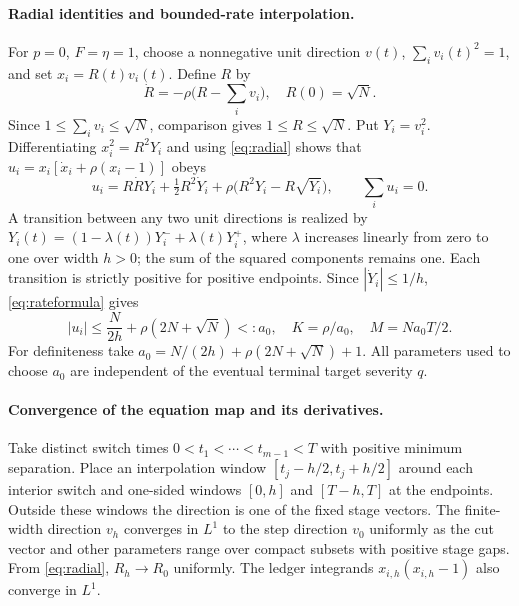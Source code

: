\documentclass[review,hidelinks,onefignum,onetabnum]{siamonline250211}%
\begin{document}
\paragraph{Radial identities and bounded-rate interpolation.}
For $p=0$, $F=\eta=1$, choose a nonnegative unit direction
$v(t)$, $\sum_i v_i(t)^2=1$, and set $x_i=R(t)v_i(t)$.
Define $R$ by
\begin{equation}\label{eq:radial}
 \dot R=-\rho\bigl(R-\sum_i v_i\bigr),\quad R(0)=\sqrt N.
\end{equation}
Since $1\le\sum_i v_i\le\sqrt N$, comparison gives
$1\le R\le\sqrt N$. Put $Y_i=v_i^2$.
Differentiating $x_i^2=R^2Y_i$ and using \eqref{eq:radial}
shows that $u_i=x_i[\dot x_i+\rho(x_i-1)]$ obeys
\begin{equation}\label{eq:rateformula}
 u_i=R\dot RY_i+\tfrac12R^2\dot Y_i
      +\rho\bigl(R^2Y_i-R\sqrt{Y_i}\bigr),\qquad \sum_i u_i=0.
\end{equation}
A transition between any two unit directions is realized by
$Y_i(t)=(1-\lambda(t))Y_i^-+\lambda(t)Y_i^+$,
where $\lambda$ increases linearly from zero to one over
width $h>0$; the sum of the squared components remains one.
Each transition is strictly positive for positive endpoints.
Since $|\dot Y_i|\le1/h$, \eqref{eq:rateformula} gives
\begin{equation}\label{eq:a0}
 |u_i|\le \frac{N}{2h}+\rho(2N+\sqrt N)<:a_0,
\quad K=\rho/a_0,\quad M=Na_0T/2.
\end{equation}
For definiteness take $a_0=N/(2h)+\rho(2N+\sqrt N)+1$.
All parameters used to choose $a_0$ are independent of the eventual
terminal target severity $q$.

\paragraph{Convergence of the equation map and its derivatives.}
Take distinct switch times $0<t_1<\cdots<t_{m-1}<T$ with
positive minimum separation. Place an interpolation window
$[t_j-h/2,t_j+h/2]$ around each interior switch and one-sided
windows $[0,h]$ and $[T-h,T]$ at the endpoints. Outside these
windows the direction is one of the fixed stage vectors.
The finite-width direction $v_h$ converges in $L^1$ to the
step direction $v_0$ uniformly as the cut vector and other parameters
range over compact subsets with positive stage gaps. From
\eqref{eq:radial}, $R_h\to R_0$ uniformly. The ledger integrands
$x_{i,h}(x_{i,h}-1)$ also converge in $L^1$.
\end{document}
